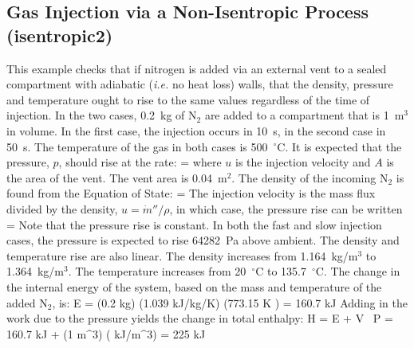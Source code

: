 \documentclass[11pt]{book}
\begin{document}
\subsection{Gas Injection via a Non-Isentropic Process (\texorpdfstring{{\bf isentropic2}}{isentropic2})}

This example checks that if nitrogen is added via an external vent to a sealed compartment with adiabatic ({\em i.e.} no heat loss) walls, that the
density, pressure and temperature ought to rise to the same values regardless of the time of injection.
In the two cases, 0.2~kg of N$_2$ are added to a compartment that is 1~m$^3$ in volume. In the first case, the injection occurs in 10~s, in the
second case in 50~s. The temperature of the gas in both cases is 500~$^\circ$C. It is expected that the pressure, $p$, should rise at the rate:
\be {} =  \ee
where $u$ is the injection velocity and $A$ is the area of the vent. The vent area is 0.04~m$^2$. The density of the incoming N$_2$ is found from the
Equation of State:
\be \rho =  \ee
The injection velocity is the mass flux divided by the density, $u=\dot{m}''/\rho$, in which case, the pressure rise can be written
\be {} =  \ee
Note that the pressure rise is constant. In both the fast and slow injection cases, the pressure is expected to rise 64282~Pa above ambient. The density
and temperature rise are also linear. The density increases from 1.164~kg/m$^3$ to 1.364~kg/m$^3$. The temperature increases from 20~$^\circ$C to 135.7~$^\circ$C.
The change in the internal energy of the system, based on the mass and temperature of the added N$_2$, is:
\be \Delta E = (0.2 \; \hbox{kg}) \times (1.039 \; \hbox{kJ/kg/K}) \times (773.15 \; \hbox{K} ) = 160.7 \; \hbox{kJ} \ee
Adding in the work due to the pressure yields the change in total enthalpy:
\be \Delta H = \Delta E + V \, \Delta P = 160.7 \; \hbox{kJ} + (1 \; \hbox{m}^3) \times (  \; \hbox{kJ/m}^3) = 225 \; \hbox{kJ} \ee
\end{document}
